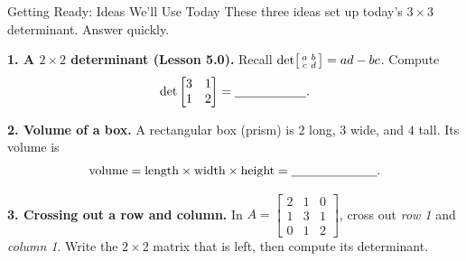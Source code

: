 \documentclass[10pt]{article}
\begin{document}
\namedateperiod

\vspace{0.12in}

\begin{notesbox}{Getting Ready: Ideas We'll Use Today}
\small These three ideas set up today's $3\times3$ determinant. Answer quickly.

\vspace{4pt}
\textbf{1. A $2\times2$ determinant (Lesson 5.0).} Recall
$\det\begin{bsmallmatrix} a & b\\ c & d \end{bsmallmatrix}=ad-bc$. Compute
\[
  \det\begin{bmatrix} 3 & 1 \\ 1 & 2 \end{bmatrix} = \blank{2.0cm}.
\]

\vspace{4pt}
\textbf{2. Volume of a box.} A rectangular box (prism) is $2$ long, $3$ wide, and $4$ tall. Its
volume is
\[
  \text{volume} = \text{length}\times\text{width}\times\text{height} = \blank{2.4cm}.
\]

\vspace{4pt}
\textbf{3. Crossing out a row and column.} In
$A=\begin{bmatrix} 2 & 1 & 0 \\ 1 & 3 & 1 \\ 0 & 1 & 2 \end{bmatrix}$, cross out \emph{row 1} and
\emph{column 1}. Write the $2\times2$ matrix that is left, then compute its determinant.
\end{notesbox}
\end{document}
